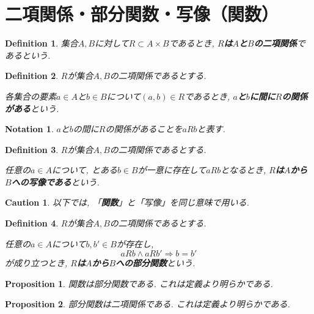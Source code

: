 \documentclass{jsbook}
\theoremstyle{plain}
\newtheorem{Def}{Definition}[chapter]
\newtheorem{Notation}{Notation}[chapter]
\newtheorem{Prop}{Proposition}[chapter]
\newtheorem{caution}{Caution}[chapter]
\begin{document}
\section{二項関係・部分関数・写像（関数）}
\begin{Def}
集合$A,B$に対して$R\subset A\times B$であるとき, {\bf $R$は$A$と$B$の二項関係}であるという.
\end{Def}
\begin{Def}
$R$が集合$A,B$の二項関係であるとする.

各集合の要素$a\in A$と$b\in B$について$(a,b)\in R$であるとき,
{\bf $a$と$b$に間に$R$の関係がある}という.
\end{Def}
\begin{Notation}
$a$と$b$の間に$R$の関係があることを$aRb$と表す.
\end{Notation}
\begin{Def}
$R$が集合$A,B$の二項関係であるとする.

任意の$a\in A$について, とある$b\in B$が一意に存在して$aRb$となるとき,
{\bf $R$は$A$から$B$への写像である}という.
\end{Def}
\begin{caution}
以下では, 「{\bf 関数}」と「写像」を同じ意味で用いる.
\end{caution}
\begin{Def}
$R$が集合$A,B$の二項関係であるとする.

任意の$a\in A$について$b,b'\in B$が存在し,
\[
aRb\land aRb'\Rightarrow b=b'
\]
が成り立つとき, {\bf $R$は$A$から$B$への部分関数}という.
\end{Def}
\begin{Prop}
関数は部分関数である. これは定義より明らかである.
\end{Prop}
\begin{Prop}
部分関数は二項関係である. これは定義より明らかである.
\end{Prop}
\end{document}
